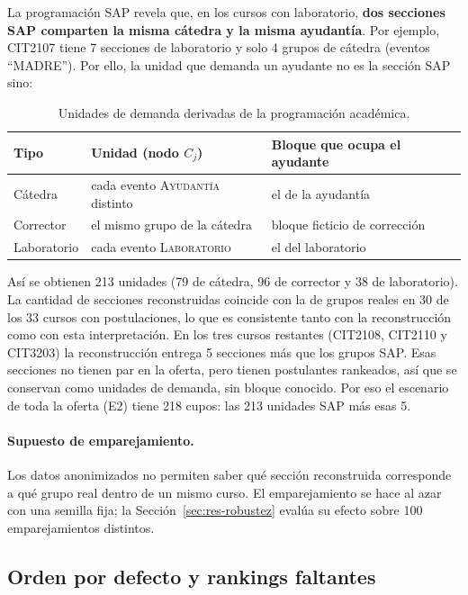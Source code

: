 \documentclass{article}
\begin{document}
La programación SAP revela que, en los cursos con laboratorio, \textbf{dos secciones SAP comparten la misma cátedra y la misma ayudantía}. Por ejemplo, CIT2107 tiene 7 secciones de laboratorio y solo 4 grupos de cátedra (eventos ``MADRE''). Por ello, la unidad que demanda un ayudante no es la sección SAP sino:

\begin{table}[H]
\centering
\small
\begin{tabular}{lll}
\toprule
\textbf{Tipo} & \textbf{Unidad (nodo $C_j$)} & \textbf{Bloque que ocupa el ayudante} \\
\midrule
Cátedra & cada evento \textsc{Ayudantía} distinto & el de la ayudantía \\
Corrector & el mismo grupo de la cátedra & bloque ficticio de corrección \\
Laboratorio & cada evento \textsc{Laboratorio} & el del laboratorio \\
\bottomrule
\end{tabular}
\caption{Unidades de demanda derivadas de la programación académica.}
\label{tab:unidades}
\end{table}

Así se obtienen 213 unidades (79 de cátedra, 96 de corrector y 38 de laboratorio). La cantidad de secciones reconstruidas coincide con la de grupos reales en 30 de los 33 cursos con postulaciones, lo que es consistente tanto con la reconstrucción como con esta interpretación. En los tres cursos restantes (CIT2108, CIT2110 y CIT3203) la reconstrucción entrega 5 secciones más que los grupos SAP. Esas secciones no tienen par en la oferta, pero tienen postulantes rankeados, así que se conservan como unidades de demanda, sin bloque conocido. Por eso el escenario de toda la oferta (E2) tiene 218 cupos: las 213 unidades SAP más esas 5.

\paragraph{Supuesto de emparejamiento.} Los datos anonimizados no permiten saber qué sección reconstruida corresponde a qué grupo real dentro de un mismo curso. El emparejamiento se hace al azar con una semilla fija; la Sección~\ref{sec:res-robustez} evalúa su efecto sobre 100 emparejamientos distintos.

\subsection{Orden por defecto y rankings faltantes}
\label{sec:orden-defecto}
\end{document}
